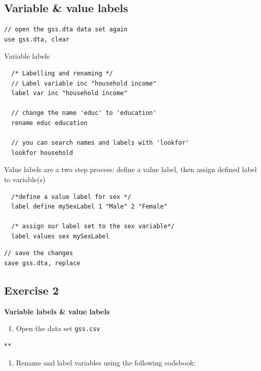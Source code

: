 \documentclass[]{book}
\providecommand{\tightlist}{%
  \setlength{\itemsep}{0pt}\setlength{\parskip}{0pt}}
\begin{document}
\hypertarget{variable-value-labels}{%
\subsection{Variable \& value labels}\label{variable-value-labels}}

\begin{verbatim}
// open the gss.dta data set again 
use gss.dta, clear
\end{verbatim}

Variable labels

\begin{verbatim}
  /* Labelling and renaming */
  // Label variable inc "household income"
  label var inc "household income"

  // change the name 'educ' to 'education'
  rename educ education

  // you can search names and labels with 'lookfor'
  lookfor household
\end{verbatim}

Value labels are a two step process: define a value label, then assign defined label to variable(s)

\begin{verbatim}
  /*define a value label for sex */
  label define mySexLabel 1 "Male" 2 "Female"

  /* assign our label set to the sex variable*/
  label values sex mySexLabel
\end{verbatim}

\begin{verbatim}
// save the changes  
save gss.dta, replace 
\end{verbatim}

\hypertarget{exercise-2-4}{%
\subsection{Exercise 2}\label{exercise-2-4}}

\textbf{Variable labels \& value labels}

\begin{enumerate}
\def\labelenumi{\arabic{enumi}.}
\tightlist
\item
  Open the data set \texttt{gss.csv}
\end{enumerate}

\begin{verbatim}
**
\end{verbatim}

\begin{enumerate}
\def\labelenumi{\arabic{enumi}.}
\setcounter{enumi}{1}
\tightlist
\item
  Rename and label variables using the following codebook:
\end{enumerate}
\end{document}
